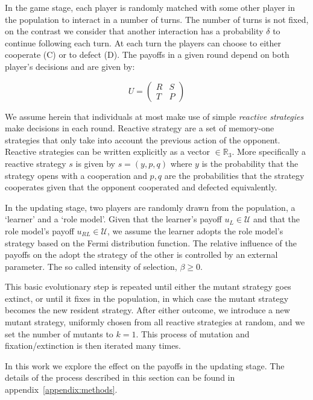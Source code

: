 \documentclass[11pt]{article}
\newcommand{\R}{\mathbb{R}}
\theoremstyle{plainCl1}
\theoremstyle{plainCl2}
\begin{document}
In the game stage, each player is randomly matched with some other player in
the population to interact in a number of turns.  The number of turns is
not fixed, on the contrast we consider that another interaction has a
probability $\delta$ to continue following each turn. At each turn the players can
choose to either cooperate (C) or to defect (D). The payoffs in a given round
depend on both player's decisions and are given by:

\begin{equation*}\label{eq:game}
  U = \begin{pmatrix} R & S  \\ T & P \end{pmatrix}
\end{equation*}

We assume herein that
individuals at most make use of simple \textit{reactive strategies} make
decisions in each round. Reactive strategy are a set of memory-one strategies
that only take into account the previous action of the opponent. Reactive
strategies can be written explicitly as a vector \(\in \R_{3}\). More
specifically a reactive strategy \(s\) is given by \(s=(y, p, q)\) where \(y\)
is the probability that the strategy opens with a cooperation and \(p, q\) are
the probabilities that the strategy cooperates given that the opponent
cooperated and defected equivalently.

In the updating stage, two players are randomly drawn from the population, a
`learner' and a `role model'. Given that the learner's payoff $u_L\!\in\!
\mathcal{U}$ and that the role model's payoff $u_{RL}\!\in\! \mathcal{U}$, we
assume the learner adopts the role model's strategy based on the Fermi
distribution function. The relative influence of the payoffs on the
adopt the strategy of the other is controlled by an external parameter. The so
called intensity of selection,  $\beta\!\ge\!0$.

This basic evolutionary step is repeated until either the mutant strategy goes
extinct, or until it fixes in the population, in which case the mutant strategy
becomes the new resident strategy. After either outcome, we introduce a new
mutant strategy, uniformly chosen from all reactive strategies at random, and we
set the number of mutants to $k\!=\!1$. This process of mutation and
fixation/extinction is then iterated many times.

In this work we explore the effect on the payoffs in the updating stage. The
details of the process described in this section can be found in
appendix~\ref{appendix:methods}.
\end{document}
